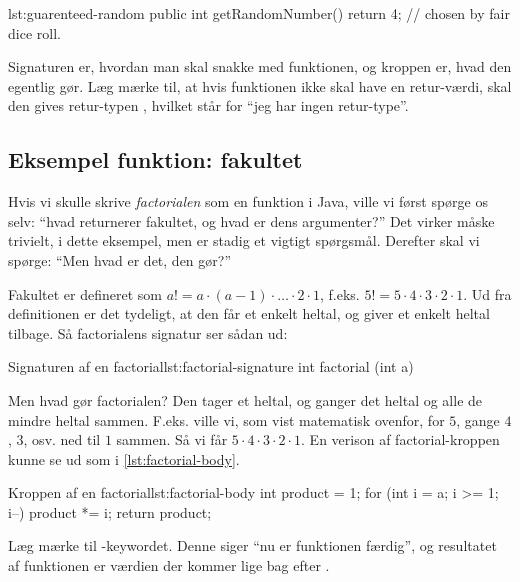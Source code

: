         \begin{JavaCode}{}{lst:guarenteed-random}
			public int getRandomNumber() {
				return 4; // chosen by fair dice roll.
			}
		\end{JavaCode}

        Signaturen er, hvordan man skal snakke med funktionen, og
        kroppen er, hvad den egentlig gør. Læg mærke til, at hvis
        funktionen ikke skal have en retur-værdi, skal den gives
        retur-typen , hvilket står for ``jeg har ingen retur-type''.

	\subsection{Eksempel funktion: fakultet}

        Hvis vi skulle skrive \emph{\gls{factorial}en} som en
        funktion i Java, ville vi først spørge os selv: ``hvad
        returnerer fakultet, og hvad er dens argumenter?'' Det virker
        måske trivielt, i dette eksempel, men er stadig et vigtigt
        spørgsmål. Derefter skal vi spørge: ``Men hvad er det, den
        gør?''

        Fakultet er defineret som \(a! = a \cdot (a-1) \cdot \dots
        \cdot 2 \cdot 1\), f.eks. \(5! = 5 \cdot 4 \cdot 3 \cdot 2
        \cdot 1\). Ud fra definitionen er det tydeligt, at den får et
        enkelt heltal, og giver et enkelt heltal tilbage. Så
        \gls{factorial}ens signatur ser sådan ud:

		\begin{JavaCode}{Signaturen af en \gls{factorial}}{lst:factorial-signature}
			int factorial (int a)
		\end{JavaCode}

		Men hvad gør \gls{factorial}en? Den tager et heltal, og ganger det heltal og alle de mindre heltal sammen. F.eks. ville vi, som vist matematisk ovenfor, for $5$, gange $4$, $3$, osv. ned til $1$ sammen. Så vi får $5\cdot4\cdot3\cdot2\cdot1$. En verison af \gls{factorial}-kroppen kunne se ud som i \autoref{lst:factorial-body}.

		\begin{JavaCode}{Kroppen af en \gls{factorial}}{lst:factorial-body}
			int product = 1;
			for (int i = a; i >= 1; i--)
				product *= i;
			return product;
		\end{JavaCode}

        Læg mærke til -keywordet. Denne siger ``nu
        er funktionen færdig'', og resultatet af funktionen er værdien
        der kommer lige bag efter .

